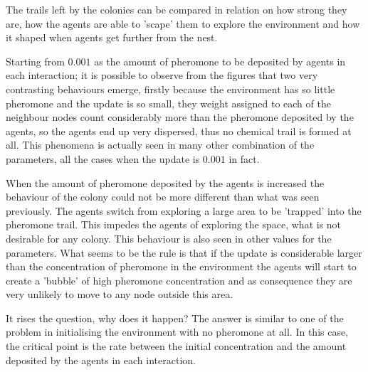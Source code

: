 The trails left by the colonies can be compared in relation on how strong they are, how the agents are able to 'scape' them to explore the environment and how it shaped when agents get further from the nest.

Starting from $0.001$ as the amount of pheromone to be deposited by agents in each interaction; it is possible to observe from the figures that two very contrasting behaviours emerge, firstly because the environment has so little pheromone and the update is so small, they weight assigned to each of the neighbour nodes count considerably more than the pheromone deposited by the agents, so the agents end up very dispersed, thus no chemical trail is formed at all. This phenomena is actually seen in many other combination of the parameters, all the cases when the update is $0.001$ in fact. 

When the amount of pheromone deposited by the agents is increased the behaviour of the colony could not be more different than what was seen previously. The agents switch from exploring a large area to be 'trapped' into the pheromone trail. This impedes the agents of exploring the space, what is not desirable for any colony. This behaviour is also seen in other values for the parameters. What seems to be the rule is that if the update is considerable larger than the concentration of pheromone in the environment the agents will start to create a 'bubble' of high pheromone concentration and as consequence they are very unlikely to move to any node outside this area.

It rises the question, why does it happen? The answer is similar to one of the problem in initialising the environment with no pheromone at all. In this case, the critical point is the rate between the initial concentration and the amount deposited by the agents in each interaction.

